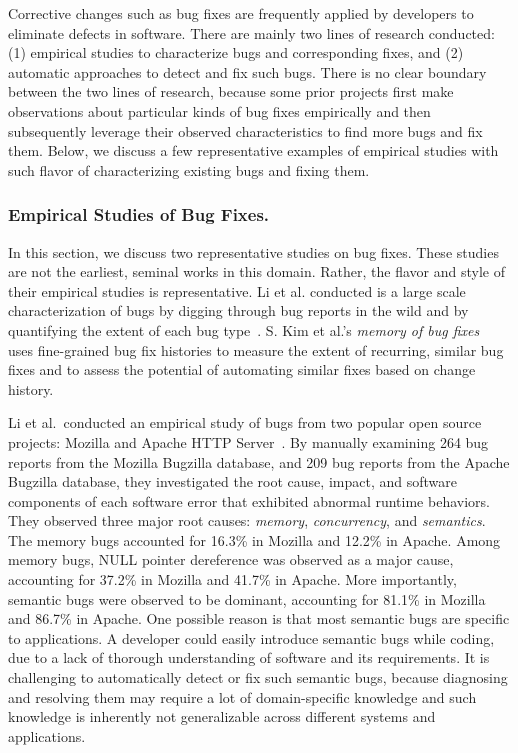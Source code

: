 Corrective changes such as bug fixes are frequently applied by developers to eliminate defects in software. There are mainly two lines of research conducted: (1) empirical studies to characterize bugs and corresponding fixes, 
 and (2) automatic approaches to detect and fix such bugs. 
 There is no clear boundary between the two lines of research, because some prior projects first make observations about particular kinds of bug fixes empirically and then subsequently leverage their observed characteristics to find more bugs and fix them. Below, we discuss a few representative examples of empirical studies with such flavor of characterizing existing bugs and fixing them.   

 
\subsubsection{Empirical Studies of Bug Fixes.}
In this section, we discuss two representative studies on bug fixes. These studies are not the earliest, seminal works in this domain. Rather, the flavor and style of their empirical studies is representative. Li et al. conducted is a large scale characterization of bugs by digging through bug reports in the wild and by quantifying the extent of each bug type~\cite{Li2006:TCE}. S. Kim et al.'s {\em memory of bug fixes}~\cite{Kim2006:MBF} uses fine-grained bug fix histories to measure the extent of recurring, similar bug fixes and to assess the potential of automating similar fixes based on change history.  

Li et al.~conducted an empirical study of bugs from two popular open source projects: Mozilla and Apache HTTP Server~\cite{Li2006:TCE}. By manually examining 264 bug reports from the Mozilla Bugzilla database, and 209 bug reports from the Apache Bugzilla database, they investigated the root cause, impact, and software components of each software error that exhibited abnormal runtime behaviors. They observed three major root causes: {\em memory}, {\em concurrency}, and {\em semantics}. The memory bugs accounted for 16.3\% in Mozilla and 12.2\% in Apache. Among memory bugs, NULL pointer dereference was observed as a major cause, accounting for 37.2\% in Mozilla and 41.7\% in Apache. More importantly, semantic bugs were observed to be dominant, accounting for 81.1\% in Mozilla and 86.7\% in Apache. One possible reason is that most semantic bugs are specific to applications. A developer could easily introduce semantic bugs while coding, due to a lack of thorough understanding of software and its requirements. It is challenging to automatically detect or fix such semantic bugs, because diagnosing and resolving them may require a lot of domain-specific knowledge and such knowledge is inherently not generalizable across different systems and applications.   

